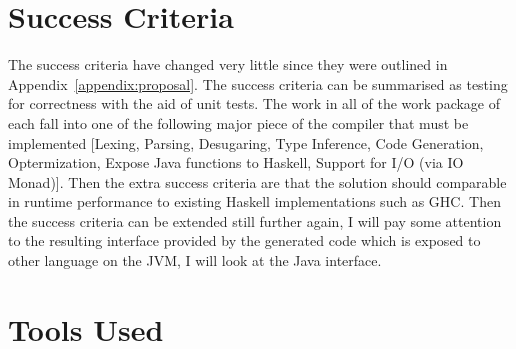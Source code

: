 \documentclass[float=false, crop=false]{standalone}
\begin{document}
\section{Success Criteria}

The success criteria have changed very little since they were outlined in
Appendix~\ref{appendix:proposal}. 
The success criteria can be summarised as testing for correctness
with the aid of unit tests. The work in all of the work package of each fall into
one of the following major piece of the compiler that must be implemented
[Lexing, Parsing, Desugaring, Type Inference,
Code Generation, Optermization, Expose Java functions to Haskell,
Support for I/O (via IO Monad)]. 
Then the extra success criteria are that the solution should 
comparable in runtime performance to existing Haskell implementations 
such as GHC. 
Then the success criteria can be extended still further again, I will
pay some attention to the resulting interface provided by the generated
code which is exposed to other language on the JVM, I will look
at the Java interface.

\section{Tools Used}
\end{document}
